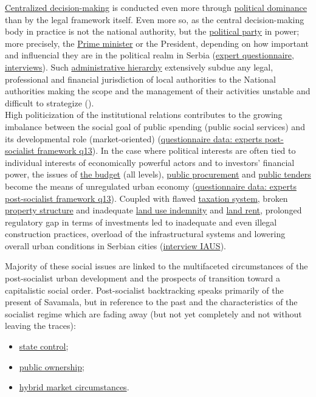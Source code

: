 \documentclass[11pt]{report}
\begin{document}
\begin{itemize}
\underline{Centralized decision-making} is conducted even more through \underline{political dominance} than by the legal framework itself.
Even more so, as the central decision-making body in practice is not the national authority, but the  \underline{political party} in power;
more precisely, the  \underline{Prime minister} or the President, depending on how important and influencial they are in the political realm in Serbia (\href{}{expert questionnaire, interviews}).
Such \underline{administrative hierarchy} extensively subdue any legal, professional and financial jurisdiction of local authorities to the National authorities making the scope and the management of their activities unstable and difficult to strategize (\cite{Novi evropski regionalizam 2}).
\\
High politicization of the institutional relations contributes to the growing imbalance between the social goal of public spending (public social services) and its developmental role (market-oriented) (\href{}{questionnaire data: experts post-socialist framework q13}).
In the case where political interests are often tied to individual interests of economically powerful actors and to investors' financial power, the issues of \underline{the budget} (all levels), \underline{public procurement} and \underline{public tenders} become the means of unregulated urban economy (\href{}{questionnaire data: experts post-socialist framework q13}).
Coupled with flawed \underline{taxation system}, broken \underline{property structure} and inadequate \underline{land use indemnity} and \underline{land rent}, prolonged regulatory gap in terms of investments led to inadequate and even illegal construction practices, overload of the infrastructural systems and lowering overall urban conditions in Serbian cities (\href{}{interview IAUS}).

Majority of these social issues are linked to the multifaceted circumstances of the post-socialist urban development and the prospects of transition toward a capitalistic social order.
Post-socialist backtracking speaks primarily of the present of Savamala, but in reference to the past and the characteristics of the socialist regime which are fading away (but not yet completely and not without leaving the traces):

\begin{itemize}
\item \underline{state control};
\item \underline{public ownership};
\item \underline{hybrid market circumstances}.
\end{itemize}


\end{itemize}
\end{document}
